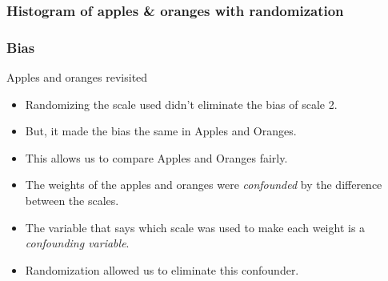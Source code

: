 \documentclass[handout]{beamer}
\begin{document}


   \begin{frame}
   \frametitle{Histogram of apples \& oranges with randomization}
   \begin{center}
   \end{center}

   \end{frame}


   \begin{frame} \frametitle{Bias}

   \begin{block}
   {Apples and oranges revisited}
   \begin{itemize}
   \item Randomizing the scale used didn't eliminate the bias
   of scale 2.
   \item But, it made the bias the same in Apples and Oranges.
   \item This allows us to compare Apples and Oranges fairly.
   \item The weights of the apples and oranges were {\em confounded} by the difference between the scales.
   \item The variable that says which scale was used to make each weight
   is a {\em confounding variable}.
   \item Randomization allowed us to eliminate this confounder.
   \end{itemize}
   \end{block}
   \end{frame}
\end{document}
